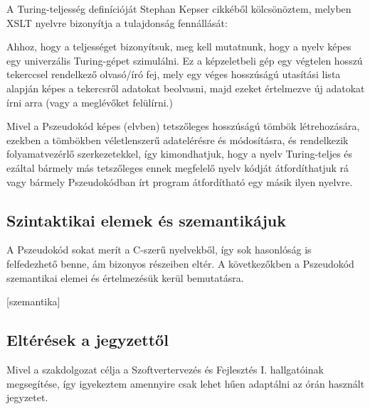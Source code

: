 A Turing-teljesség definícióját Stephan Kepser cikkéből kölcsönöztem, melyben XSLT nyelvre bizonyítja a tulajdonság fennállását:

\cite{turing}

Ahhoz, hogy a teljességet bizonyítsuk, meg kell mutatnunk, hogy a nyelv képes egy univerzális Turing-gépet szimulálni. Ez a képzeletbeli gép egy végtelen hosszú tekerccsel rendelkező olvasó/író fej, mely egy véges hosszúságú utasítási lista alapján képes a tekercsről adatokat beolvasni, majd ezeket értelmezve új adatokat írni arra (vagy a meglévőket felülírni.)

Mivel a Pszeudokód képes (elvben) tetszőleges hosszúságú tömbök létrehozására, ezekben a tömbökben véletlenszerű adatelérésre és módosításra, és rendelkezik folyamatvezérlő szerkezetekkel, így kimondhatjuk, hogy a nyelv Turing-teljes és ezáltal bármely más tetszőleges ennek megfelelő nyelv kódját átfordíthatjuk rá vagy bármely Pszeudokódban írt program átfordítható egy másik ilyen nyelvre.

\subsection{Szintaktikai elemek és szemantikájuk}

A Pszeudokód sokat merít a C-szerű nyelvekből, így sok hasonlóság is felfedezhető benne, ám bizonyos részeiben eltér. A következőkben a Pszeudokód szemantikai elemei és értelmezésük kerül bemutatásra.

[szemantika]

\subsection{Eltérések a jegyzettől}

Mivel a szakdolgozat célja a Szoftvertervezés és Fejlesztés I. hallgatóinak megsegítése, így igyekeztem amennyire csak lehet hűen adaptálni az órán használt jegyzetet\cite{jegyzet}.

